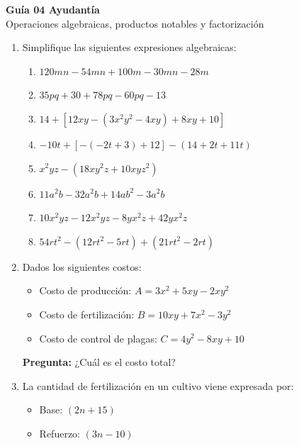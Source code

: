 \documentclass[12pt]{article}
\begin{document}
	
	\vspace*{1em}
	
	\begin{center}
		{\Large \textbf{Guía 04 Ayudantía}}\\[0.3em]
		{\small Operaciones algebraicas, productos notables y factorización}
	\end{center}
	
	\vspace{0.5cm}
	
	\begin{enumerate}
		
		\item Simplifique las siguientes expresiones algebraicas:
		\begin{enumerate}[label=\alph*)]
			\item $120mn - 54mn + 100m - 30mn - 28m$
			\item $35pq + 30 + 78pq - 60pq - 13$
			\item $14 + [12xy - (3x^2y^2 - 4xy) + 8xy + 10]$
			\item $-10t + [-(-2t + 3) + 12] - (14 + 2t + 11t)$
			\item $x^2yz - (18xy^2z + 10xyz^2)$
			\item $11a^2b - 32a^2b + 14ab^2 - 3a^2b$
			\item $10x^2yz - 12x^2yz - 8yx^2z + 42yx^2z$
			\item $54rt^2 - (12rt^2 - 5rt) + (21rt^2 - 2rt)$
		\end{enumerate}
		
		\item Dados los siguientes costos:
		\begin{itemize}
			\item Costo de producción: $A = 3x^2 + 5xy - 2xy^2$
			\item Costo de fertilización: $B = 10xy + 7x^2 - 3y^2$
			\item Costo de control de plagas: $C = 4y^2 - 8xy + 10$
		\end{itemize}
		
		\textbf{Pregunta:} ¿Cuál es el costo total?
		
		\item La cantidad de fertilización en un cultivo viene expresada por:
		\begin{itemize}
			\item Base: $(2n + 15)$
			\item Refuerzo: $(3n - 10)$
		\end{itemize}
		

\end{enumerate}
\end{document}
